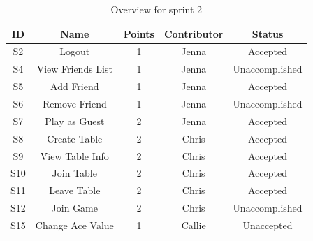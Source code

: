 \begin{table}[!hbt]
\centering
\caption{Overview for sprint 2}
\label{tab: sprint 2 overview}
\begin{tabular}{|c|c|c|c|c|}
\hline
\textbf{ID} & \textbf{Name}                                                        & \textbf{Points} & \textbf{Contributor} & \textbf{Status}                       \\ \hline
S2          & Logout                                                               & 1               & Jenna                & {\color[HTML]{32CB00} Accepted}       \\ \hline
S4          & View Friends List                                                    & 1               & Jenna                & {\color[HTML]{CB0000} Unaccomplished} \\ \hline
S5          & Add Friend                                                           & 1               & Jenna                & {\color[HTML]{32CB00} Accepted}       \\ \hline
S6          & Remove Friend                                                        & 1               & Jenna                & {\color[HTML]{CB0000} Unaccomplished} \\ \hline
S7          & Play as Guest                                                        & 2               & Jenna                & {\color[HTML]{32CB00} Accepted}       \\ \hline
S8          & Create Table                                                         & 2               & Chris                & {\color[HTML]{32CB00} Accepted}       \\ \hline
S9          & {\color[HTML]{FFC702} View Table Info}                               & 2               & Chris                & {\color[HTML]{32CB00} Accepted}       \\ \hline
S10         & Join Table                                                           & 2               & Chris                & {\color[HTML]{32CB00} Accepted}       \\ \hline
S11         & {\color[HTML]{FFC702} Leave Table}                                   & 2               & Chris                & {\color[HTML]{32CB00} Accepted}       \\ \hline
S12         & Join Game                                                            & 2               & Chris                & {\color[HTML]{CB0000} Unaccomplished} \\ \hline
S15         & Change Ace Value                                                     & 1               & Callie               & {\color[HTML]{CB0000} Unaccepted}     \\ \hline

\end{tabular}
\end{table}
